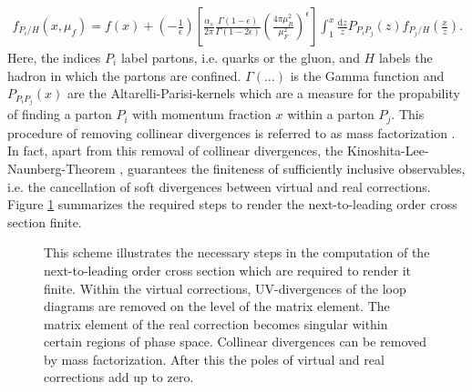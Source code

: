 \begin{align}
f_{P_i / H}(x,\mu_f) = f(x) + \left( -\frac{1}{\epsilon} \right)\left[ \frac{\alpha_s}{2\pi} \frac{\Gamma(1-\epsilon)}{\Gamma(1-2\epsilon)} \left( \frac{4\pi\mu_R^2}{\mu_F^2} \right)^\epsilon\right] \int_1^x\frac{\mathrm{d}z}{z} P_{P_i P_j}(z)f_{P_j / H}(\frac{x}{z}).
\end{align}
Here, the indices $P_i$ label partons, i.e. quarks or the gluon, and $H$ labels the hadron in which the partons are confined. $\Gamma(\hdots)$ is the Gamma function and $P_{P_i P_j}(x)$ are the Altarelli-Parisi-kernels\cite{Altarelli:1977zs} which are a measure for the propability of finding a parton $P_i$ with momentum fraction $x$ within a parton $P_j$. This procedure of removing collinear divergences is referred to as mass factorization \cite{dissertori2003quantum}.\\
In fact, apart from this removal of collinear divergences, the Kinoshita-Lee-Naunberg-Theorem \cite{1962JMP.....3..650K},\cite{PhysRev.133.B1549} guarantees the finiteness of sufficiently inclusive observables, i.e. the cancellation of soft divergences between virtual and real corrections.\\
Figure \ref{fig:DivergenceSummary} summarizes the required steps to render the next-to-leading order cross section finite.
\begin{figure}[H]
\begin{center}
\caption{This scheme illustrates the necessary steps in the computation of the next-to-leading order cross section which are required to render it finite. Within the virtual corrections, UV-divergences of the loop diagrams are removed on the level of the matrix element. The matrix element of the real correction becomes singular within certain regions of phase space. Collinear divergences can be removed by mass factorization. After this the poles of virtual and real corrections add up to zero.}\label{fig:DivergenceSummary}
\end{center}
\end{figure}


